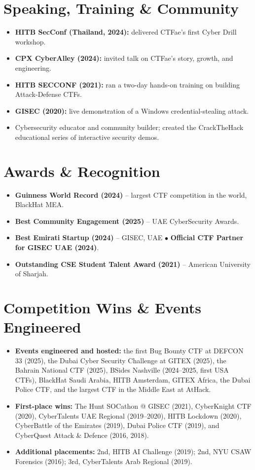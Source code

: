 \documentclass[10pt,a4paper]{article}
\begin{document}
\section{Speaking, Training \& Community}
\begin{itemize}
    \item {\small \textbf{HITB SecConf (Thailand, 2024):} delivered CTFae's first Cyber Drill workshop.}
    \item {\small \textbf{CPX CyberAlley (2024):} invited talk on CTFae's story, growth, and engineering.}
    \item {\small \textbf{HITB SECCONF (2021):} ran a two-day hands-on training on building Attack-Defense CTFs.}
    \item {\small \textbf{GISEC (2020):} live demonstration of a Windows credential-stealing attack.}
    \item {\small Cybersecurity educator and community builder; created the CrackTheHack educational series of interactive security demos.}
\end{itemize}

\section{Awards \& Recognition}
\begin{itemize}
    \item {\small \textbf{Guinness World Record (2024)} -- largest CTF competition in the world, BlackHat MEA.}
    \item {\small \textbf{Best Community Engagement (2025)} -- UAE CyberSecurity Awards.}
    \item {\small \textbf{Best Emirati Startup (2024)} -- GISEC, UAE \quad $\bullet$ \quad \textbf{Official CTF Partner for GISEC UAE (2024)}.}
    \item {\small \textbf{Outstanding CSE Student Talent Award (2021)} -- American University of Sharjah.}
\end{itemize}

\section{Competition Wins \& Events Engineered}
\begin{itemize}
    \item {\small \textbf{Events engineered and hosted:} the first Bug Bounty CTF at DEFCON 33 (2025), the Dubai Cyber Security Challenge at GITEX (2025), the Bahrain National CTF (2025), BSides Nashville (2024--2025, first USA CTFs), BlackHat Saudi Arabia, HITB Amsterdam, GITEX Africa, the Dubai Police CTF, and the largest CTF in the Middle East at AtHack.}
    \item {\small \textbf{First-place wins:} The Hunt SOCathon @ GISEC (2021), CyberKnight CTF (2020), CyberTalents UAE Regional (2019--2020), HITB Lockdown (2020), CyberBattle of the Emirates (2019), Dubai Police CTF (2019), and CyberQuest Attack \& Defence (2016, 2018).}
    \item {\small \textbf{Additional placements:} 2nd, HITB AI Challenge (2019); 2nd, NYU CSAW Forensics (2016); 3rd, CyberTalents Arab Regional (2019).}
\end{itemize}
\end{document}
